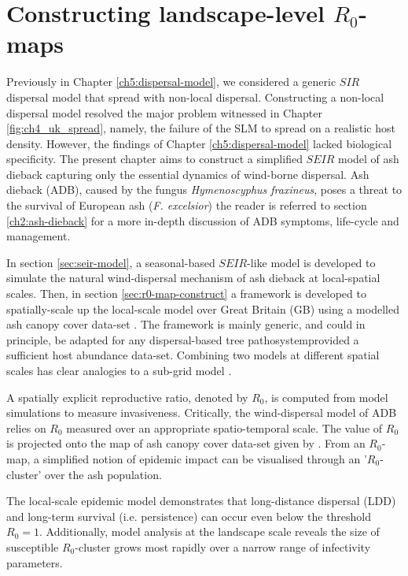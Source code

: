 \chapter{Constructing landscape-level $R_0$-maps}

Previously in Chapter \ref{ch5:dispersal-model}, we considered a generic $SIR$ dispersal model that spread with non-local dispersal. 
Constructing a non-local dispersal model resolved the major problem witnessed in Chapter \ref{fig:ch4_uk_spread}, namely, the failure of the SLM to spread on a realistic host density. 
However, the findings of Chapter \ref{ch5:dispersal-model} lacked biological specificity.
The present chapter aims to construct a simplified $SEIR$ model of ash dieback capturing only the essential dynamics of wind-borne dispersal.
Ash dieback (ADB), caused by the fungus \textit{Hymenoscyphus fraxineus}, poses a threat to the survival of European ash (\textit{F. excelsior})\textemdash
the reader is referred to section \ref{ch2:ash-dieback} for a more in-depth discussion of ADB symptoms, life-cycle and management.

In section \ref{sec:seir-model}, a seasonal-based $SEIR$-like model is developed to simulate the natural wind-dispersal mechanism of ash dieback at local-spatial scales. 
Then, in section \ref{sec:r0-map-construct} a framework is developed to spatially-scale up the local-scale model over Great Britain (GB) using a modelled ash canopy cover data-set \cite{hill.data}.
The framework is mainly generic, and could in principle, be adapted for any dispersal-based tree pathosystem\textemdash provided a sufficient host abundance data-set.
Combining two models at different spatial scales has clear analogies to a sub-grid model \cite{sub-grid}.
 
A spatially explicit reproductive ratio, denoted by $R_0$, is computed from model simulations to measure invasiveness.
Critically, the wind-dispersal model of ADB relies on $R_0$  measured over an appropriate spatio-temporal scale.
The value of $R_0$ is projected onto the map of ash canopy cover data-set given by \cite{hill.data}.
From an $R_0$-map, a simplified notion of epidemic impact can be visualised through an '$R_0$-cluster' over the ash population.

The local-scale epidemic model demonstrates that long-distance dispersal (LDD) and long-term survival (i.e. persistence)  
can occur even below the threshold $R_0=1$.
Additionally, model analysis at the landscape scale reveals the size of susceptible $R_0$-cluster grows most rapidly over a narrow range of infectivity parameters.

